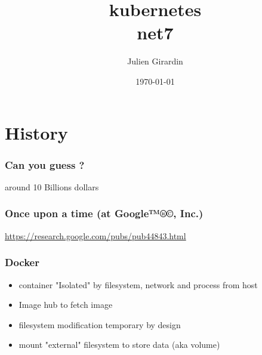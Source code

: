 \documentclass{beamer}
\title{kubernetes \\
       net7}
\author{Julien Girardin}
\date{\today}
\begin{document}
\maketitle{}

\section{History}

\begin{frame}
\frametitle{Can you guess ?}
\centering
\vfill
around 10 Billions dollars
\vfill
{}
\end{frame}

\begin{frame}
  \frametitle{Once upon a time (at Google{\tiny ™®©}, Inc.)}
  \begin{center}
  \href{https://research.google.com/pubs/pub44843.html}
       {https://research.google.com/pubs/pub44843.html}
  \vfill
  \end{center}
\end{frame}

\begin{frame}
  \frametitle{Docker}
  \begin{itemize}
    \item container "Isolated" by filesystem, network and process from host
    \item Image hub to fetch image
    \item filesystem modification temporary by design
    \item mount "external" filesystem to store data (aka volume)
  \end{itemize}
\end{frame}
\end{document}
